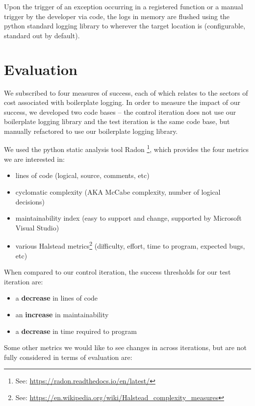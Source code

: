 \documentclass[acmsmall,review,authorversion]{acmart}
\begin{document}
Upon the trigger of an exception occurring in a registered function or a manual trigger by the developer via code, the logs in memory are flushed using the python standard logging library to wherever the target location is (configurable, standard out by default).


\section{Evaluation}

We subscribed to four measures of success, each of which relates to the sectors of cost associated with boilerplate logging. In order to measure the impact of our success, we developed two code bases -- the control iteration does not use our boilerplate logging library and the test iteration is the same code base, but manually refactored to use our boilerplate logging library.

We used the python static analysis tool Radon \footnote{See: \href{https://radon.readthedocs.io/en/latest/}{https://radon.readthedocs.io/en/latest/}}, which provides the four metrics we are interested in:

\begin{itemize}
    \item lines of code (logical, source, comments, etc)
    \item cyclomatic complexity (AKA McCabe complexity, number of logical decisions)
    \item maintainability index (easy to support and change, supported by Microsoft Visual Studio)
    \item various Halstead metrics\footnote{See: \href{https://en.wikipedia.org/wiki/Halstead_complexity_measures}{https://en.wikipedia.org/wiki/Halstead\_complexity\_measures}} (difficulty, effort, time to program, expected bugs, etc)
\end{itemize}

When compared to our control iteration, the success thresholds for our test iteration are:

\begin{itemize}
    \item a \textbf{decrease} in lines of code
    \item an \textbf{increase} in maintainability
    \item a \textbf{decrease} in time required to program
\end{itemize}

Some other metrics we would like to see changes in across iterations, but are not fully considered in terms of evaluation are:
\end{document}
